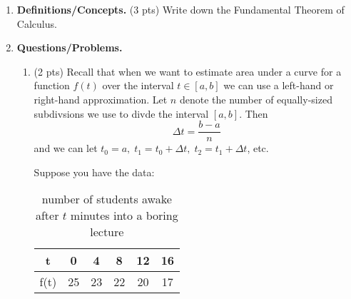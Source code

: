 \documentclass[11pt,letterpaper]{article}
\begin{document}
\begin{enumerate}
\item  \textbf{Definitions/Concepts.} (3 pts) Write down the Fundamental Theorem of Calculus.  
\vfill

\vspace{5pc}

\item \textbf{Questions/Problems.} 
\begin{enumerate}
\item (2 pts) Recall that when we want to estimate area under a curve for a function $f(t)$ over the interval $t\in[a,b]$ we can use a left-hand or right-hand approximation.  Let $n$ denote the number of equally-sized subdivsions we use to divde the interval $[a,b]$.  Then
\[\Delta t=\frac{b-a}{n}\]
and we can let $t_0=a,\;t_1=t_0+\Delta t,\;t_2=t_1+\Delta t$, etc.   

Suppose you have the data:
\begin{table}[h]
\centering
\begin{tabular}{|c|c|c|c|c|c|}
\hline
t & 0 & 4 & 8 & 12 & 16 \\ [0.5ex]
\hline 
f(t) & 25 & 23 & 22 & 20 & 17 \\ [0.5ex]
\hline
\end{tabular}
\caption{number of students awake after $t$ minutes into a boring lecture}
\end{table}


\end{enumerate}
\end{enumerate}
\end{document}
